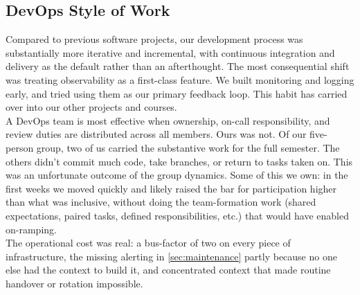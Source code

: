 
\subsection{DevOps Style of Work}
Compared to previous software projects, our development process was substantially more iterative 
and incremental, with continuous integration and delivery as the default rather than an afterthought. 
The most consequential shift was treating observability as a first-class feature. We built monitoring and
logging early, and tried using them as our primary feedback loop. This habit has carried over into 
our other projects and courses. \\
A DevOps team is most effective when ownership, on-call responsibility, and review duties are 
distributed across all members. Ours was not. 
Of our five-person group, two of us carried the substantive work for the full semester. The others didn't commit 
much code, take branches, or return to tasks taken on. This was an unfortunate outcome of the group dynamics. 
Some of this we own: in the first weeks we moved quickly and likely raised the bar for 
participation higher than what was inclusive, without doing the team-formation work (shared 
expectations, paired tasks, defined responsibilities, etc.) that would have enabled on-ramping. \\
The operational cost was real: a bus-factor of two on every piece of infrastructure, the missing 
alerting in \cref{sec:maintenance} partly because no one else had the context to build it, and 
concentrated context that made routine handover or rotation impossible.